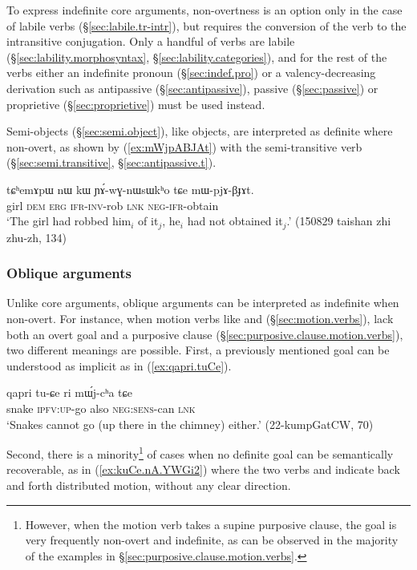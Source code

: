 To express indefinite core arguments, non-overtness is an option only in the case of labile verbs (§\ref{sec:labile.tr-intr}), but requires the conversion of the verb to the intransitive conjugation. Only a handful of verbs are labile (§\ref{sec:lability.morphosyntax}, §\ref{sec:lability.categories}), and for the rest of the verbs either an indefinite pronoun (§\ref{sec:indef.pro}) or a valency-decreasing derivation such as antipassive (§\ref{sec:antipassive}), passive (§\ref{sec:passive}) or proprietive (§\ref{sec:proprietive}) must be used instead.

Semi-objects (§\ref{sec:semi.object}), like objects, are interpreted as definite where non-overt, as shown by (\ref{ex:mWjpABJAt}) with the semi-transitive verb  (§\ref{sec:semi.transitive}, §\ref{sec:antipassive.t}).

\begin{exe}
\ex \label{ex:mWjpABJAt}
\gll tɕʰemɤpɯ nɯ kɯ ɲɤ́-wɣ-nɯsɯkʰo tɕe mɯ-pjɤ-βɟɤt. \\
girl \textsc{dem} \textsc{erg} \textsc{ifr}-\textsc{inv}-rob \textsc{lnk} \textsc{neg}-\textsc{ifr}-obtain \\
\glt `The girl had robbed him$_i$ of it$_j$, he$_i$ had not obtained it$_j$.' (150829 taishan zhi zhu-zh, 134)
\end{exe}

\subsubsection{Oblique arguments}
Unlike core arguments, oblique arguments can be interpreted as indefinite when non-overt. For instance, when motion verbs like  and  (§\ref{sec:motion.verbs}), lack both an overt goal and a purposive clause (§\ref{sec:purposive.clause.motion.verbs}), two different meanings are possible. First, a previously mentioned goal can be understood as implicit as in (\ref{ex:qapri.tuCe}).

\begin{exe} 
\ex \label{ex:qapri.tuCe}
\gll qapri tu-ɕe ri mɯ́j-cʰa tɕe \\
snake \textsc{ipfv}:\textsc{up}-go also \textsc{neg}:\textsc{sens}-can \textsc{lnk} \\
\glt `Snakes cannot go (up there in the chimney) either.' (22-kumpGatCW, 70)
\end{exe} 

Second, there is a minority\footnote{However, when the motion verb takes a supine purposive clause, the goal is very frequently non-overt and indefinite, as can be observed in the majority of the examples in §\ref{sec:purposive.clause.motion.verbs}.  } of cases when no definite goal can be semantically recoverable, as in (\ref{ex:kuCe.nA.YWGi2}) where the two verbs  and  indicate back and forth distributed motion, without any clear direction.

